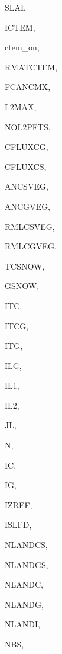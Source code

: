{\begin{DoxyParamCaption}
\item[{real, dimension(ilg,ictem)}]{S\+L\+A\+I, }
\item[{integer}]{I\+C\+T\+E\+M, }
\item[{logical}]{ctem\+\_\+on, }
\item[{real, dimension(ilg,ictem,ig)}]{R\+M\+A\+T\+C\+T\+E\+M, }
\item[{real, dimension(ilg,ictem)}]{F\+C\+A\+N\+C\+M\+X, }
\item[{integer}]{L2\+M\+A\+X, }
\item[{integer, dimension(ic)}]{N\+O\+L2\+P\+F\+T\+S, }
\item[{real, dimension(ilg)}]{C\+F\+L\+U\+X\+C\+G, }
\item[{real, dimension(ilg)}]{C\+F\+L\+U\+X\+C\+S, }
\item[{real, dimension(ilg,ictem)}]{A\+N\+C\+S\+V\+E\+G, }
\item[{real, dimension(ilg,ictem)}]{A\+N\+C\+G\+V\+E\+G, }
\item[{real, dimension(ilg,ictem)}]{R\+M\+L\+C\+S\+V\+E\+G, }
\item[{real, dimension(ilg,ictem)}]{R\+M\+L\+C\+G\+V\+E\+G, }
\item[{real, dimension(ilg)}]{T\+C\+S\+N\+O\+W, }
\item[{real, dimension(ilg)}]{G\+S\+N\+O\+W, }
\item[{integer}]{I\+T\+C, }
\item[{integer}]{I\+T\+C\+G, }
\item[{integer}]{I\+T\+G, }
\item[{integer}]{I\+L\+G, }
\item[{integer}]{I\+L1, }
\item[{integer}]{I\+L2, }
\item[{integer}]{J\+L, }
\item[{integer}]{N, }
\item[{integer}]{I\+C, }
\item[{integer}]{I\+G, }
\item[{integer}]{I\+Z\+R\+E\+F, }
\item[{integer}]{I\+S\+L\+F\+D, }
\item[{integer}]{N\+L\+A\+N\+D\+C\+S, }
\item[{integer}]{N\+L\+A\+N\+D\+G\+S, }
\item[{integer}]{N\+L\+A\+N\+D\+C, }
\item[{integer}]{N\+L\+A\+N\+D\+G, }
\item[{integer}]{N\+L\+A\+N\+D\+I, }
\item[{integer}]{N\+B\+S, }

\end{DoxyParamCaption}}
